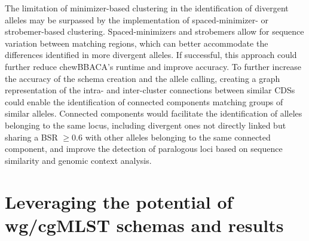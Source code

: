 The limitation of minimizer-based clustering in the identification of divergent alleles may be surpassed by the implementation of spaced-minimizer- or strobemer-based clustering. Spaced-minimizers and strobemers allow for sequence variation between matching regions, which can better accommodate the differences identified in more divergent alleles. If successful, this approach could further reduce chewBBACA's runtime and improve accuracy. To further increase the accuracy of the schema creation and the allele calling, creating a graph representation of the intra- and inter-cluster connections between similar CDSs could enable the identification of connected components matching groups of similar alleles. Connected components would facilitate the identification of alleles belonging to the same locus, including divergent ones not directly linked but sharing a BSR $\geq0.6$ with other alleles belonging to the same connected component, and improve the detection of paralogous loci based on sequence similarity and genomic context analysis.

\section{Leveraging the potential of wg/cgMLST schemas and results}

